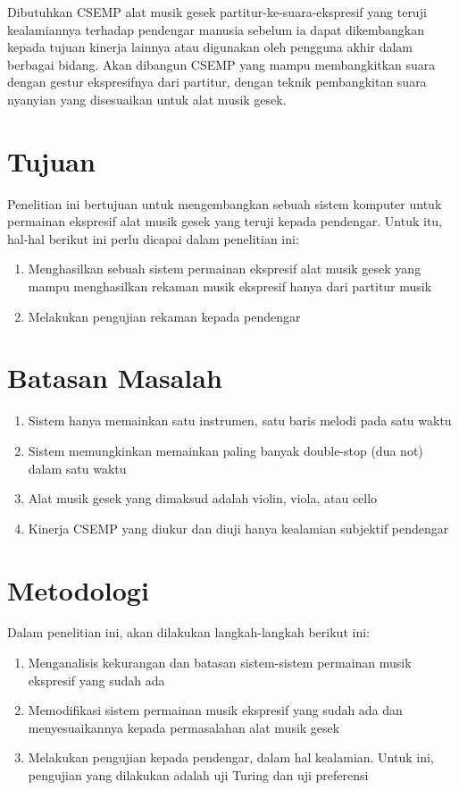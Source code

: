 Dibutuhkan CSEMP alat musik gesek partitur-ke-suara-ekspresif yang teruji kealamiannya terhadap pendengar manusia sebelum ia dapat dikembangkan kepada tujuan kinerja lainnya atau digunakan oleh pengguna akhir dalam berbagai bidang. Akan dibangun CSEMP yang mampu membangkitkan suara dengan gestur ekspresifnya dari partitur, dengan teknik pembangkitan suara nyanyian yang disesuaikan untuk alat musik gesek.

\section{Tujuan}

Penelitian ini bertujuan untuk mengembangkan sebuah sistem komputer untuk permainan ekspresif alat musik gesek yang teruji kepada pendengar. Untuk itu, hal-hal berikut ini perlu dicapai dalam penelitian ini:
\begin{enumerate}
	\item Menghasilkan sebuah sistem permainan ekspresif alat musik gesek yang mampu menghasilkan rekaman musik ekspresif hanya dari partitur musik
	\item Melakukan pengujian rekaman kepada pendengar
\end{enumerate}

\section{Batasan Masalah}

\begin{enumerate}
	\item Sistem hanya memainkan satu instrumen, satu baris melodi pada satu waktu
	\item Sistem memungkinkan memainkan paling banyak double-stop (dua not) dalam satu waktu
	\item Alat musik gesek yang dimaksud adalah violin, viola, atau cello
	\item Kinerja CSEMP yang diukur dan diuji hanya kealamian subjektif pendengar
\end{enumerate}

\section{Metodologi}

Dalam penelitian ini, akan dilakukan langkah-langkah berikut ini:
\begin{enumerate}
	\item Menganalisis kekurangan dan batasan sistem-sistem permainan musik ekspresif yang sudah ada
	\item Memodifikasi sistem permainan musik ekspresif yang sudah ada dan menyesuaikannya kepada permasalahan alat musik gesek
	\item Melakukan pengujian kepada pendengar, dalam hal kealamian. Untuk ini, pengujian yang dilakukan adalah uji Turing dan uji preferensi
\end{enumerate}